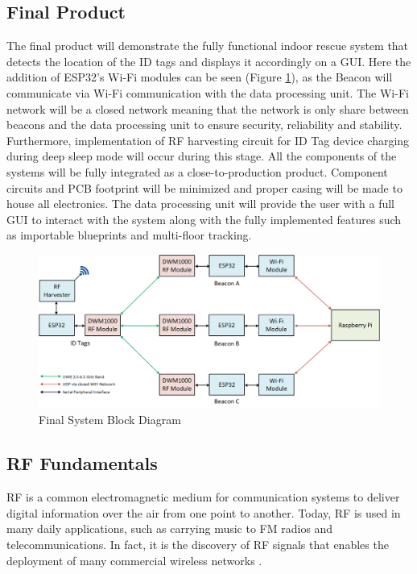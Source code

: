 \subsection{Final Product}
\medskip
The final product will demonstrate the fully functional indoor rescue system that detects the location of the ID tags and displays it accordingly on a GUI. Here the addition of ESP32’s Wi-Fi modules can be seen (Figure \ref{final}), as the Beacon will communicate via Wi-Fi communication with the data processing unit. The Wi-Fi network will be a closed network meaning that the network is only share between beacons and the data processing unit to ensure security, reliability and stability. Furthermore, implementation of RF harvesting circuit for ID Tag device charging during deep sleep mode will occur during this stage. All the components of the systems will be fully integrated as a close-to-production product. Component circuits and PCB footprint will be minimized and proper casing will be made to house all electronics. The data processing unit will provide the user with a full GUI to interact with the system along with the fully implemented features such as importable blueprints and multi-floor tracking.

\bigskip
\begin{figure}[H]
\centering
    \includegraphics[width=\linewidth]{./images/03_final.png}
    \caption{Final System Block Diagram}
    \label{final}
\end{figure}


\pagebreak
\subsection{RF Fundamentals}
\medskip
RF is a common electromagnetic medium for communication systems to deliver digital information over the air from one point to another. Today, RF is used in many daily applications, such as carrying music to FM radios and telecommunications. In fact, it is the discovery of RF signals that enables the deployment of many commercial wireless networks \cite{R2-4-1}.

